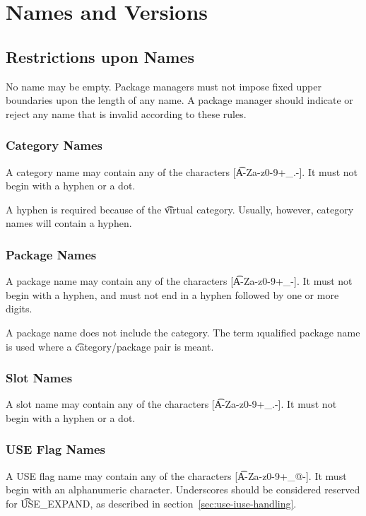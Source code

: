 \chapter{Names and Versions}

\section{Restrictions upon Names}

No name may be empty. Package managers must not impose fixed upper boundaries upon the length of any
name. A package manager should indicate or reject any name that is invalid according to these rules.

\subsection{Category Names}
A category name may contain any of the characters [\t{A-Za-z0-9+\_.-}]. It must not begin with
a hyphen or a dot.

\note A hyphen is  required because of the \t{virtual} category. Usually, however, category
names will contain a hyphen.

\subsection{Package Names}
A package name may contain any of the characters [\t{A-Za-z0-9+\_-}]. It must not begin with a
hyphen, and must not end in a hyphen followed by one or more digits.

\note A package name does not include the category. The term \i{qualified package name} is used
where a \t{category/package} pair is meant.

\subsection{Slot Names}
\label{sec:slot-names}
A slot name may contain any of the characters [\t{A-Za-z0-9+\_.-}]. It must not begin with a
hyphen or a dot.

\subsection{USE Flag Names}
A USE flag name may contain any of the characters [\t{A-Za-z0-9+\_@-}]. It must begin with an
alphanumeric character. Underscores should be considered reserved for \t{USE\_EXPAND}, as
described in section~\ref{sec:use-iuse-handling}.


